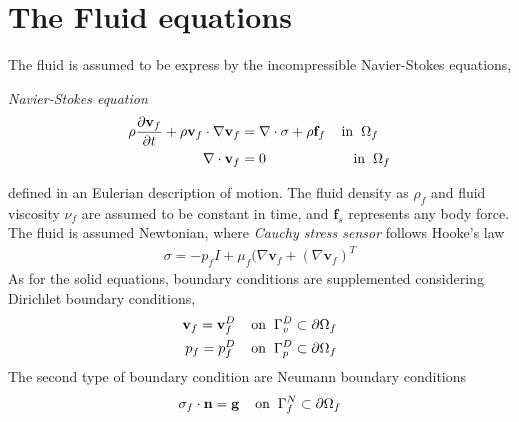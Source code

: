 \section{The Fluid equations}
\label{sec:fluidprob}
The fluid is assumed to be express by the incompressible Navier-Stokes equations,
\begin{equat}
\textit{Navier-Stokes equation}
\begin{align}
\rho \pder{\mathbf{v}_f}{t} + \rho \mathbf{v}_f \cdot \nabla \mathbf{v}_f &=
\nabla \cdot \sigma + \rho \mathbf{f}_f \hspace{4mm} \text{in} \hspace{2mm} \Omega_f \\
\nabla \cdot \mathbf{v}_f &= 0 \hspace{22mm} \text{in} \hspace{2mm} \Omega_f 
\end{align} 
\end{equat}
defined in an Eulerian description of motion. The fluid density as $\rho_f$ and fluid viscosity $\nu_f$ are assumed to be constant in time, and $\mathbf{f}_s$ represents any body force. 
The fluid is assumed Newtonian, where \textit{Cauchy stress sensor} follows Hooke's law
\begin{align*}
\sigma = -p_f I + \mu_f (\nabla \mathbf{v}_f + (\nabla \mathbf{v}_f)^T
\end{align*}
As for the solid equations, boundary conditions are supplemented considering Dirichlet boundary conditions, 
\begin{align}
\mathbf{v}_f = \mathbf{v}_f^D 
\hspace{4mm} \text{on} \hspace{2mm} \Gamma_v^D \subset \partial \Omega_f \\
p_f = p_f^D 
\hspace{4mm} \text{on} \hspace{2mm} \Gamma_p^D \subset \partial \Omega_f
\end{align}
The second type of boundary condition are Neumann boundary conditions
\begin{align}
\sigma_f \cdot \mathbf{n} = \mathbf{g} 
\hspace{4mm} \text{on} \hspace{2mm} \Gamma_f^N \subset \partial \Omega_f 
\end{align}
